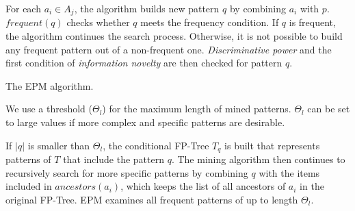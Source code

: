 For each $a_i \in A_j$, the algorithm builds new pattern $q$ by combining $a_i$ with $p$.
$frequent(q)$ checks whether $q$ meets the frequency condition.
If $q$ is frequent, the algorithm continues the search process.
Otherwise, it is not possible to build any frequent pattern out of a non-frequent one.
\emph{Discriminative power} and the first condition of \emph{information novelty} are then checked for pattern $q$.
\begin{algorithm}[htp]
\SetAlgoLined
\DontPrintSemicolon 
\SetAlFnt{\small}
\caption{The EPM algorithm.}
\label{mine_patt}
\end{algorithm}

We use a threshold ($\Theta_l$) 
for the maximum length of mined patterns.
$\Theta_l$ can be set to large values if more complex and specific patterns are desirable.

If $|q|$ is smaller than $\Theta_l$,
the conditional FP-Tree $T_{q}$ is built that represents patterns of $T$ that include the pattern $q$.
The mining algorithm then continues 
to recursively search for more specific patterns by combining $q$ with the items included in $ancestors(a_i)$,
which keeps the list of all ancestors of $a_i$ in the original FP-Tree.
EPM examines all frequent patterns of up to length $\Theta_l$. 
%

